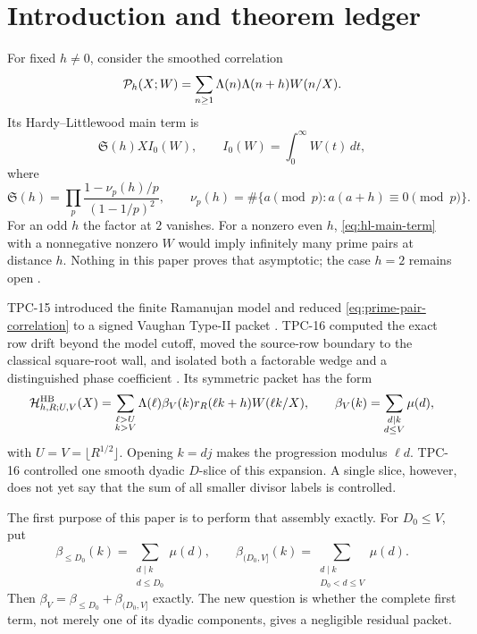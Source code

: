 \section{Introduction and theorem ledger}

For fixed $h\ne0$, consider the smoothed correlation
\begin{equation}
 \mathcal P_h(X;W)=\sum_{n\ge1}\Lambda(n)\Lambda(n+h)W(n/X).
 \label{eq:prime-pair-correlation}
\end{equation}
Its Hardy--Littlewood main term is
\begin{equation}
 \mathfrak S(h)X I_0(W),
 \qquad
 I_0(W)=\int_0^\infty W(t)\,dt,
 \label{eq:hl-main-term}
\end{equation}
where
\begin{equation}
 \mathfrak S(h)=
 \prod_p\frac{1-\nu_p(h)/p}{(1-1/p)^2},
 \qquad
 \nu_p(h)=\#\{a\pmod p:a(a+h)\equiv0\pmod p\}.
 \label{eq:singular-series}
\end{equation}
For an odd $h$ the factor at $2$ vanishes.  For a nonzero even $h$,
\eqref{eq:hl-main-term} with a nonnegative nonzero $W$ would imply
infinitely many prime pairs at distance $h$.  Nothing in this paper
proves that asymptotic; the case $h=2$ remains open
\citep{HardyLittlewood1923,Selberg1952Parity,Polymath2014}.

TPC-15 introduced the finite Ramanujan model and reduced
\eqref{eq:prime-pair-correlation} to a signed Vaughan Type-II packet
\citep{WangTPC15}.  TPC-16 computed the exact row drift beyond the model
cutoff, moved the source-row boundary to the classical square-root wall,
and isolated both a factorable wedge and a distinguished phase
coefficient \citep{WangTPC16}.  Its symmetric packet has the form
\begin{equation}
 \mathcal H^{\mathrm{HB}}_{h,R;U,V}(X)
 =
 \sum_{\substack{\ell>U\\k>V}}
 \Lambda(\ell)\beta_V(k)r_R(\ell k+h)W(\ell k/X),
 \qquad
 \beta_V(k)=\sum_{\substack{d\mid k\\d\le V}}\mu(d),
 \label{eq:tpc16-symmetric-packet}
\end{equation}
with $U=V=\lfloor R^{1/2}\rfloor$.  Opening $k=dj$ makes the
progression modulus $\ell d$.  TPC-16 controlled one smooth dyadic
$D$-slice of this expansion.  A single slice, however, does not yet say
that the sum of all smaller divisor labels is controlled.

The first purpose of this paper is to perform that assembly exactly.
For $D_0\le V$, put
\begin{equation}
 \beta_{\le D_0}(k)
 =\sum_{\substack{d\mid k\\d\le D_0}}\mu(d),
 \qquad
 \beta_{(D_0,V]}(k)
 =\sum_{\substack{d\mid k\\D_0<d\le V}}\mu(d).
 \label{eq:prefix-tail-coefficients}
\end{equation}
Then $\beta_V=\beta_{\le D_0}+\beta_{(D_0,V]}$ exactly.  The new
question is whether the complete first term, not merely one of its
dyadic components, gives a negligible residual packet.

